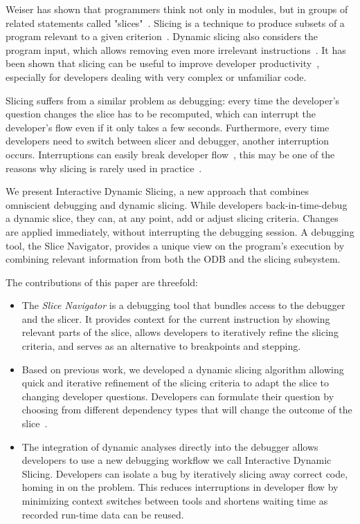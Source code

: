 \documentclass[
			english,
			]{elsarticle}
\begin{document}
Weiser has shown that programmers think not only in modules, but in groups of related statements called "slices"~\cite{weiser_programmers_1982}.
Slicing is a technique to produce subsets of a program relevant to a given criterion~\cite{weiser_program_1981}.
Dynamic slicing also considers the program input, which allows removing even more irrelevant instructions~\cite{korel_dynamic_1990, agrawal_dynamic_1990}.
It has been shown that slicing can be useful to improve developer productivity~\cite{weiser_programmers_1982, agrawal_dynamic_1990}, especially for developers dealing with very complex or unfamiliar code.

Slicing suffers from a similar problem as debugging:
every time the developer's question changes the slice has to be recomputed, which can interrupt the developer's flow even if it only takes a few seconds.
Furthermore, every time developers need to switch between slicer and debugger, another interruption occurs.
Interruptions can easily break developer flow~\cite{altmann_04_task_interruption_resumption_lag}, this may be one of the reasons why slicing is rarely used in practice~\cite{perscheid_studying_2017}.

We present Interactive Dynamic Slicing, a new approach that combines omniscient debugging and dynamic slicing.
While developers back-in-time-debug a dynamic slice, they can, at any point, add or adjust slicing criteria.
Changes are applied immediately, without interrupting the debugging session.
A debugging tool, the Slice Navigator, provides a unique view on the program's execution by combining relevant information from both the ODB and the slicing subsystem.

The contributions of this paper are threefold:
\begin{itemize}
	\item The \emph{Slice Navigator} is a debugging tool that bundles access to the debugger and the slicer.
		It provides context for the current instruction by showing relevant parts of the slice, allows developers to iteratively refine the slicing criteria, and serves as an alternative to breakpoints and stepping.
	\item Based on previous work, we developed a dynamic slicing algorithm allowing quick and iterative refinement of the slicing criteria to adapt the slice to changing developer questions.
		Developers can formulate their question by choosing from different dependency types that will change the outcome of the slice~\cite{treffer_dynamic_2014}.
	\item The integration of dynamic analyses directly into the debugger allows developers to use a new debugging workflow we call Interactive Dynamic Slicing. Developers can isolate a bug by iteratively slicing away correct code, homing in on the problem.
	This reduces interruptions in developer flow by minimizing context switches between tools and shortens waiting time as recorded run-time data can be reused.
\end{itemize}
\end{document}
